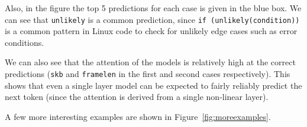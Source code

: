 Also, in the figure the top 5 predictions for each case is given in the blue
box. We can see that {\tt unlikely} is a common prediction, since {\tt if
(unlikely(condition))} is a common pattern in Linux code to check for unlikely
edge cases such as error conditions.

We can also see that the attention of the models is relatively high at the
correct predictions ({\tt skb} and {\tt framelen} in the first and second cases
respectively). This shows that even a single layer model can be expected to
fairly reliably predict the next token (since the attention is derived from a
single non-linear layer).

A few more interesting examples are shown in Figure~\ref{fig:moreexamples}.

